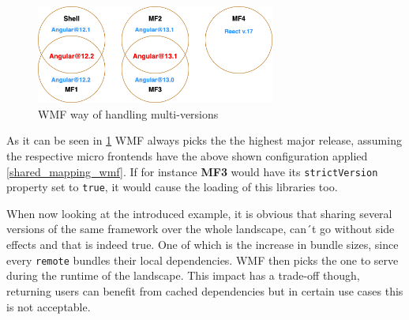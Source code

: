\begin{figure}[!h]
	\centering
	\includegraphics[width=0.7\textwidth]{Figures/multi_version_diagramm.drawio.png}
	\caption{WMF way of handling multi-versions}
	\label{fig:wmf_multiversions}
\end{figure}

As it can be seen in \ref{fig:wmf_multiversions} WMF always picks the the highest major release, assuming the respective micro frontends have the above shown configuration applied \ref{shared_mapping_wmf}. If for instance \textbf{MF3} would have its \texttt{strictVersion} property set to \texttt{true}, it would cause the loading of this libraries too.

When now looking at the introduced example, it is obvious that sharing several versions of the same framework over the whole landscape, can´t go without side effects and that is indeed true. One of which is the increase in bundle sizes, since every \texttt{remote} bundles their local dependencies. WMF then picks the one to serve during the runtime of the landscape.
This impact has a trade-off though, returning users can benefit from cached dependencies but in certain use cases this is not acceptable.\cite{wmf_multi_versions}
 
